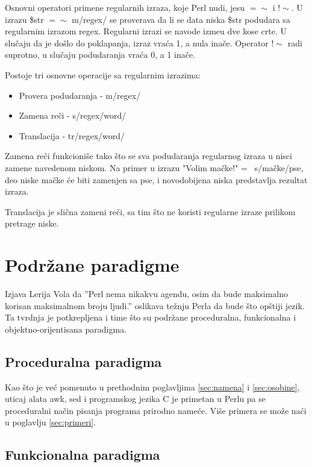 \documentclass[a4paper]{article}
\begin{document}
Osnovni operatori primene regularnih izraza, koje Perl nudi, jesu $=\sim$ i $!\sim$. U izrazu \$str $=\sim$ m/regex/ se proverava da li se data niska \$str podudara sa regularnim izrazom regex. Regularni izrazi se navode izme\dj{}u dve kose crte. U slučaju da je došlo do poklapanja, izraz vraća 1, a nula inače. Operator $!\sim$ radi suprotno, u slučaju podudaranja vraća 0, a 1 inače.

Postoje tri osnovne operacije sa regularnim izrazima:

\begin{itemize}
  \item Provera podudaranja - m/regex/
  \item Zamena re\v ci - s/regex/word/
  \item Translacija - tr/regex/word/
\end{itemize}

Zamena reči funkcioniše tako što se sva podudaranja regularnog izraza u nisci zamene navedenom niskom. Na primer u izrazu "Volim mačke!" =~ s/mačke/pse, deo niske mačke \' ce biti zamenjen sa pse, i novodobijena niska predstavlja rezultat izraza.

Translacija je slična zameni reči, sa tim što ne koristi regularne izraze prilikom pretrage niske.


\section{Podržane paradigme}

Izjava Lerija Vola da ''Perl nema nikakvu agendu, osim da bude maksimalno korisan maksimalnom broju ljudi.''\cite{walltalk} oslikava težnju Perla da bude što opštiji jezik. Ta tvrdnja je potkrepljena i time što su podržane proceduralna, funkcionalna i objektno-orijentisana paradigma. 

\subsection{Proceduralna paradigma}
Kao što je već pomenuto u prethodnim poglavljima \ref{sec:namena} i \ref{sec:osobine}, uticaj alata awk, sed i programskog jezika C je primetan u Perlu pa se proceduralni način pisanja programa prirodno nameće. Više primera se može naći u poglavlju \ref{sec:primeri}.

\subsection{Funkcionalna paradigma}
\end{document}
